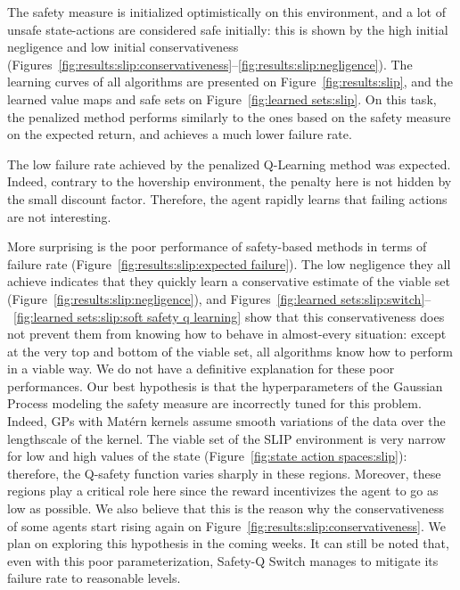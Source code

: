 The safety measure is initialized optimistically on this environment, and a lot of unsafe state-actions are considered safe initially: this is shown by the high initial negligence and low initial conservativeness (Figures~\ref{fig:results:slip:conservativeness}--\ref{fig:results:slip:negligence}). The learning curves of all algorithms are presented on Figure~\ref{fig:results:slip}, and the learned value maps and safe sets on Figure~\ref{fig:learned sets:slip}. On this task, the penalized method performs similarly to the ones based on the safety measure on the expected return, and achieves a much lower failure rate. \par
The low failure rate achieved by the penalized Q-Learning method was expected. Indeed, contrary to the hovership environment, the penalty here is not hidden by the small discount factor. Therefore, the agent rapidly learns that failing actions are not interesting. \par
More surprising is the poor performance of safety-based methods in terms of failure rate (Figure~\ref{fig:results:slip:expected failure}). The low negligence they all achieve indicates that they quickly learn a conservative estimate of the viable set (Figure~\ref{fig:results:slip:negligence}), and Figures~\ref{fig:learned sets:slip:switch}--~\ref{fig:learned sets:slip:soft safety q learning} show that this conservativeness does not prevent them from knowing how to behave in almost-every situation: except at the very top and bottom of the viable set, all algorithms know how to perform in a viable way. We do not have a definitive explanation for these poor performances. Our best hypothesis is that the hyperparameters of the Gaussian Process modeling the safety measure are incorrectly tuned for this problem. Indeed, GPs with Matérn kernels assume smooth variations of the data over the lengthscale of the kernel. The viable set of the SLIP environment is very narrow for low and high values of the state (Figure~\ref{fig:state action spaces:slip}): therefore, the Q-safety function varies sharply in these regions. Moreover, these regions play a critical role here since the reward incentivizes the agent to go as low as possible. We also believe that this is the reason why the conservativeness of some agents start rising again on Figure~\ref{fig:results:slip:conservativeness}. We plan on exploring this hypothesis in the coming weeks. It can still be noted that, even with this poor parameterization, Safety-Q Switch manages to mitigate its failure rate to reasonable levels.\par
